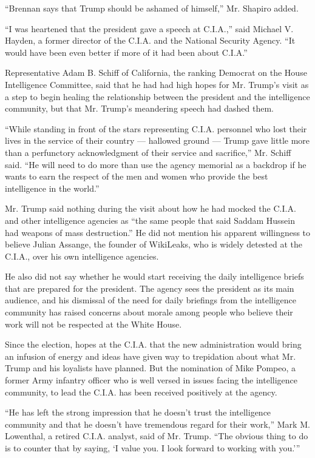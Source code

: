 ``Brennan says that Trump should be ashamed of himself,'' Mr. Shapiro
added.

``I was heartened that the president gave a speech at C.I.A.,'' said
Michael V. Hayden, a former director of the C.I.A. and the National
Security Agency. ``It would have been even better if more of it had been
about C.I.A.''

Representative Adam B. Schiff of California, the ranking Democrat on the
House Intelligence Committee, said that he had had high hopes for Mr.
Trump's visit as a step to begin healing the relationship between the
president and the intelligence community, but that Mr. Trump's
meandering speech had dashed them.

``While standing in front of the stars representing C.I.A. personnel who
lost their lives in the service of their country --- hallowed ground ---
Trump gave little more than a perfunctory acknowledgment of their
service and sacrifice,'' Mr. Schiff said. ``He will need to do more than
use the agency memorial as a backdrop if he wants to earn the respect of
the men and women who provide the best intelligence in the world.''

Mr. Trump said nothing during the visit about how he had mocked the
C.I.A. and other intelligence agencies as ``the same people that said
Saddam Hussein had weapons of mass destruction.'' He did not mention his
apparent willingness to believe Julian Assange, the founder of
WikiLeaks, who is widely detested at the C.I.A., over his own
intelligence agencies.

He also did not say whether he would start receiving the daily
intelligence briefs that are prepared for the president. The agency sees
the president as its main audience, and his dismissal of the need for
daily briefings from the intelligence community has raised concerns
about morale among people who believe their work will not be respected
at the White House.

Since the election, hopes at the C.I.A. that the new administration
would bring an infusion of energy and ideas have given way to
trepidation about what Mr. Trump and his loyalists have planned. But the
nomination of Mike Pompeo, a former Army infantry officer who is well
versed in issues facing the intelligence community, to lead the C.I.A.
has been received positively at the agency.

``He has left the strong impression that he doesn't trust the
intelligence community and that he doesn't have tremendous regard for
their work,'' Mark M. Lowenthal, a retired C.I.A. analyst, said of Mr.
Trump. ``The obvious thing to do is to counter that by saying, `I value
you. I look forward to working with you.'''

